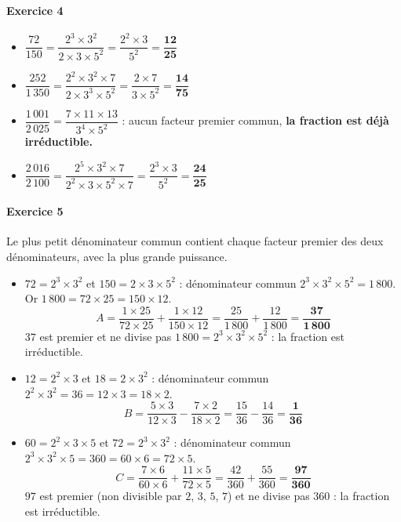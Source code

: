 \documentclass[11pt,a4paper]{article}
\newcommand{\exo}[1]{\paragraph{Exercice #1}}
\newcommand{\rep}[1]{\textbf{#1}}
\begin{document}
\exo{4}
\begin{itemize}
  \item $\dfrac{72}{150} = \dfrac{2^3 \times 3^2}{2 \times 3 \times 5^2} = \dfrac{2^2 \times 3}{5^2} = \mathbf{\dfrac{12}{25}}$
  \item $\dfrac{252}{1\,350} = \dfrac{2^2 \times 3^2 \times 7}{2 \times 3^3 \times 5^2} = \dfrac{2 \times 7}{3 \times 5^2} = \mathbf{\dfrac{14}{75}}$
  \item $\dfrac{1\,001}{2\,025} = \dfrac{7 \times 11 \times 13}{3^4 \times 5^2}$ : aucun facteur premier commun, \rep{la fraction est déjà irréductible.}
  \item $\dfrac{2\,016}{2\,100} = \dfrac{2^5 \times 3^2 \times 7}{2^2 \times 3 \times 5^2 \times 7} = \dfrac{2^3 \times 3}{5^2} = \mathbf{\dfrac{24}{25}}$
\end{itemize}

\exo{5}
Le plus petit dénominateur commun contient chaque facteur premier des deux dénominateurs, avec la plus grande puissance.
\begin{itemize}
  \item $72 = 2^3 \times 3^2$ et $150 = 2 \times 3 \times 5^2$ : dénominateur commun $2^3 \times 3^2 \times 5^2 = 1\,800$. Or $1\,800 = 72 \times 25 = 150 \times 12$.
  \[ A = \frac{1 \times 25}{72 \times 25} + \frac{1 \times 12}{150 \times 12} = \frac{25}{1\,800} + \frac{12}{1\,800} = \mathbf{\frac{37}{1\,800}} \]
  $37$ est premier et ne divise pas $1\,800 = 2^3 \times 3^2 \times 5^2$ : la fraction est irréductible.

  \item $12 = 2^2 \times 3$ et $18 = 2 \times 3^2$ : dénominateur commun $2^2 \times 3^2 = 36 = 12 \times 3 = 18 \times 2$.
  \[ B = \frac{5 \times 3}{12 \times 3} - \frac{7 \times 2}{18 \times 2} = \frac{15}{36} - \frac{14}{36} = \mathbf{\frac{1}{36}} \]

  \item $60 = 2^2 \times 3 \times 5$ et $72 = 2^3 \times 3^2$ : dénominateur commun $2^3 \times 3^2 \times 5 = 360 = 60 \times 6 = 72 \times 5$.
  \[ C = \frac{7 \times 6}{60 \times 6} + \frac{11 \times 5}{72 \times 5} = \frac{42}{360} + \frac{55}{360} = \mathbf{\frac{97}{360}} \]
  $97$ est premier (non divisible par $2$, $3$, $5$, $7$) et ne divise pas $360$ : la fraction est irréductible.
\end{itemize}
\end{document}
